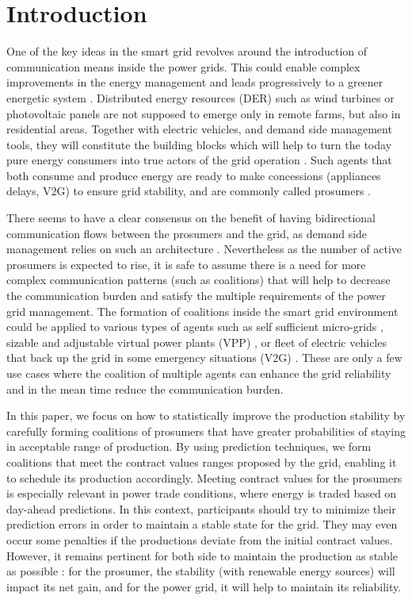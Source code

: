 \documentclass[conference]{IEEEtran}
\begin{document}
\section{Introduction}
\label{sec:introduction}

One of the key ideas in the smart grid revolves around the introduction of communication means inside the power grids. This could enable complex improvements in the energy management and leads progressively to a greener energetic system \cite{Ramchurn} \cite{WuHamedHuangBook2011}. Distributed energy resources (DER) such as wind turbines or photovoltaic panels are not supposed to emerge only in remote farms, but also in residential areas. Together with electric vehicles, and demand side management tools, they will constitute the building blocks which will help to turn the today pure energy consumers into true actors of the grid operation \cite{Ramchurn}. Such agents that both consume and produce energy are ready to make concessions (appliances delays, V2G) to ensure grid stability, and are commonly called prosumers \cite{Rathnayaka2012} \cite{Ramchurn}.

There seems to have a clear consensus on the benefit of having bidirectional communication flows between the prosumers and the grid, as demand side management relies on such an architecture \cite{WuHamedHuangBook2011}. Nevertheless as the number of active prosumers is expected to rise, it is safe to assume there is a need for more complex communication patterns (such as coalitions) that will help to decrease the communication burden and satisfy the multiple requirements of the power grid management. The formation of coalitions inside the smart grid environment could be applied to various types of agents such as self sufficient micro-grids \cite{Pahwa}, sizable and adjustable virtual power plants (VPP) \cite{Braun, Ramchurn}, or fleet of electric vehicles that back up the grid in some emergency situations (V2G) \cite{Ramchurn}. These are only a few use cases where the coalition of multiple agents can enhance the grid reliability and in the mean time reduce the communication burden.

In this paper, we focus on how to statistically improve the production stability by carefully forming coalitions of prosumers that have greater probabilities of staying in acceptable range of production. By using prediction techniques, we form coalitions that meet the contract values ranges proposed by the grid, enabling it to schedule its production accordingly. Meeting contract values for the prosumers is especially relevant in power trade conditions, where energy is traded based on day-ahead predictions. In this context, participants should try to minimize their prediction errors in order to maintain a stable state for the grid. They may even occur some penalties if the productions deviate from the initial contract values. However, it remains pertinent for both side to maintain the production as stable as possible : for the prosumer, the stability (with renewable energy sources) will impact its net gain, and for the power grid, it will help to maintain its reliability.
\end{document}
